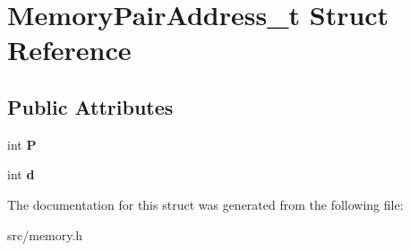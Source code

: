 \hypertarget{structMemoryPairAddress__t}{}\section{Memory\+Pair\+Address\+\_\+t Struct Reference}
\label{structMemoryPairAddress__t}
\subsection*{Public Attributes}
\begin{DoxyCompactItemize}
\item 
int {\bfseries P}\hypertarget{structMemoryPairAddress__t_a5bc11426b27565b959f280dd1a18b080}{}\label{structMemoryPairAddress__t_a5bc11426b27565b959f280dd1a18b080}

\item 
int {\bfseries d}\hypertarget{structMemoryPairAddress__t_ad608e86288286889c2658e8043414edf}{}\label{structMemoryPairAddress__t_ad608e86288286889c2658e8043414edf}

\end{DoxyCompactItemize}


The documentation for this struct was generated from the following file\+:\begin{DoxyCompactItemize}
\item 
src/memory.\+h\end{DoxyCompactItemize}
